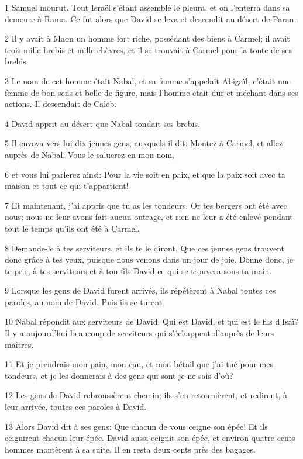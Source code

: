 \par 1 Samuel mourut. Tout Israël s'étant assemblé le pleura, et on l'enterra dans sa demeure à Rama. Ce fut alors que David se leva et descendit au désert de Paran.
\par 2 Il y avait à Maon un homme fort riche, possédant des biens à Carmel; il avait trois mille brebis et mille chèvres, et il se trouvait à Carmel pour la tonte de ses brebis.
\par 3 Le nom de cet homme était Nabal, et sa femme s'appelait Abigaïl; c'était une femme de bon sens et belle de figure, mais l'homme était dur et méchant dans ses actions. Il descendait de Caleb.
\par 4 David apprit au désert que Nabal tondait ses brebis.
\par 5 Il envoya vers lui dix jeunes gens, auxquels il dit: Montez à Carmel, et allez auprès de Nabal. Vous le saluerez en mon nom,
\par 6 et vous lui parlerez ainsi: Pour la vie soit en paix, et que la paix soit avec ta maison et tout ce qui t'appartient!
\par 7 Et maintenant, j'ai appris que tu as les tondeurs. Or tes bergers ont été avec nous; nous ne leur avons fait aucun outrage, et rien ne leur a été enlevé pendant tout le temps qu'ils ont été à Carmel.
\par 8 Demande-le à tes serviteurs, et ils te le diront. Que ces jeunes gens trouvent donc grâce à tes yeux, puisque nous venons dans un jour de joie. Donne donc, je te prie, à tes serviteurs et à ton fils David ce qui se trouvera sous ta main.
\par 9 Lorsque les gens de David furent arrivés, ils répétèrent à Nabal toutes ces paroles, au nom de David. Puis ils se turent.
\par 10 Nabal répondit aux serviteurs de David: Qui est David, et qui est le fils d'Isaï? Il y a aujourd'hui beaucoup de serviteurs qui s'échappent d'auprès de leurs maîtres.
\par 11 Et je prendrais mon pain, mon eau, et mon bétail que j'ai tué pour mes tondeurs, et je les donnerais à des gens qui sont je ne sais d'où?
\par 12 Les gens de David rebroussèrent chemin; ils s'en retournèrent, et redirent, à leur arrivée, toutes ces paroles à David.
\par 13 Alors David dit à ses gens: Que chacun de vous ceigne son épée! Et ils ceignirent chacun leur épée. David aussi ceignit son épée, et environ quatre cents hommes montèrent à sa suite. Il en resta deux cents près des bagages.
